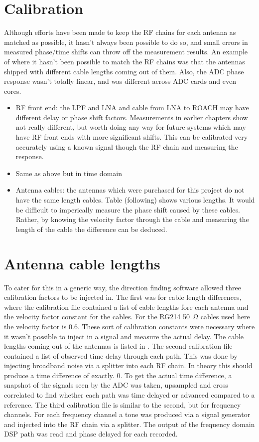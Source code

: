 \section{Calibration}


Although efforts have been made to keep the RF chains for each antenna as matched as possible, it hasn't always been possible to do so, and small errors in measured phase/time shifts can throw off the measurement results. An example of where it hasn't been possible to match the RF chains was that the antennas shipped with different cable lengths coming out of them. Also, the ADC phase response wasn't totally linear, and was different across ADC cards and even cores. 
\begin{itemize}
  \item RF front end: the LPF and LNA and cable from LNA to ROACH may have different delay or phase shift factors. Measurements in earlier chapters show not really different, but worth doing any way for future systems which may have RF front ends with more significant shifts. This can be calibrated very accurately using a known signal though the RF chain and measuring the response.
  \item Same as above but in time domain
  \item Antenna cables: the antennas which were purchased for this project do not have the same length cables. Table (following) shows various lengths. It would be difficult to imperically measure the phase shift caused by these cables. Rather, by knowing the velocity factor through the cable and measuring the length of the cable the difference can be deduced.
\end{itemize}

\section{Antenna cable lengths}

To cater for this in a generic way, the direction finding software allowed three calibration factors to be injected in. 
The first was for cable length differences, where the calibration file contained a list of cable lengths fore each antenna and the velocity factor constant for the cables. For the RG214 \SI{50}{\ohm} cables used here the velocity factor is 0.6. These sort of calibration constants were necessary where it wasn't possible to inject in a signal and measure the actual delay. The cable lengths coming out of the antennas is listed in .
The second calibration file contained a list of observed time delay through each path. This was done by injecting broadband noise via a splitter into each RF chain. In theory this should produce a time difference of exactly. 0. To get the actual time difference, a snapshot of the signals seen by the ADC was taken, upsampled and cross correlated to find whether each path was time delayed or advanced compared to a reference.
The third calibration file is similar to the second, but for frequency channels. For each frequency channel a tone was produced via a signal generator and injected into the RF chain via a splitter. The output of the frequency domain DSP path was read and phase delayed for each recorded.

